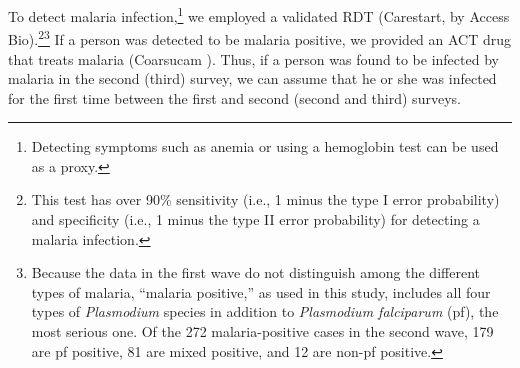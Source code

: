\documentclass[fleqn,11pt]{article}
\begin{document}
To detect malaria infection,\footnote{%
Detecting symptoms such as anemia \citep{cohen_free_2010} or using a hemoglobin test \citep
{blackburn_bednets_2008} can be used as a proxy.} we employed a validated RDT
(Carestart\textregistered, by Access Bio).\footnote{This test has over 90\% sensitivity (i.e., 1 minus the type I error probability) and
specificity (i.e., 1 minus the type II error probability) for detecting a malaria infection.}\footnote{Because the data in the first wave do not distinguish among the different types of malaria, ``malaria positive,'' as used in this
study, includes all four types of \textit{Plasmodium} species in addition to 
\textit{Plasmodium falciparum} (pf), the most serious one. 
Of the 272 malaria-positive cases in the second wave, 179 are pf positive, 81 are mixed positive, and 12 are non-pf positive.} If a person was detected to be malaria
positive, we provided an ACT drug that treats malaria (Coarsucam \textregistered). Thus, if a person was
found to be infected by malaria in the second (third) survey, we can assume that he or she was infected for the first time between the first and second (second and third) surveys.
\end{document}
